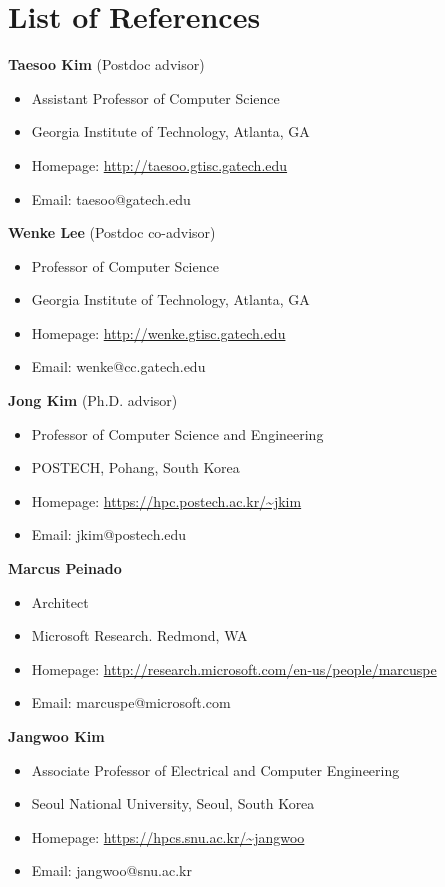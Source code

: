 \section*{List of References}

\begin{description}
    \item \textbf{Taesoo Kim} (Postdoc advisor)
      \begin{itemize}
        \setlength\itemsep{0.1pt}
        \item Assistant Professor of Computer Science
        \item Georgia Institute of Technology, Atlanta, GA
        \item Homepage: \url{http://taesoo.gtisc.gatech.edu}
        \item Email: taesoo@gatech.edu
      \end{itemize}
    \item \textbf{Wenke Lee} (Postdoc co-advisor)
      \begin{itemize}
        \setlength\itemsep{0.1pt}
        \item Professor of Computer Science
        \item Georgia Institute of Technology, Atlanta, GA
        \item Homepage: \url{http://wenke.gtisc.gatech.edu}
        \item Email: wenke@cc.gatech.edu
      \end{itemize}
    \item \textbf{Jong Kim} (Ph.D. advisor)
      \begin{itemize}
        \setlength\itemsep{0.1pt}
        \item Professor of Computer Science and Engineering
        \item POSTECH, Pohang, South Korea
        \item Homepage: \url{https://hpc.postech.ac.kr/~jkim}
        \item Email: jkim@postech.edu
      \end{itemize}
    \item \textbf{Marcus Peinado}
      \begin{itemize}
        \setlength\itemsep{0.1pt}
        \item Architect
        \item Microsoft Research. Redmond, WA 
        \item Homepage: \url{http://research.microsoft.com/en-us/people/marcuspe} 
        \item Email: marcuspe@microsoft.com
      \end{itemize}
    \item \textbf{Jangwoo Kim}
      \begin{itemize}
        \setlength\itemsep{0.1pt}
        \item Associate Professor of Electrical and Computer Engineering
        \item Seoul National University, Seoul, South Korea
        \item Homepage: \url{https://hpcs.snu.ac.kr/~jangwoo}
        \item Email: jangwoo@snu.ac.kr
      \end{itemize}

\end{description}
